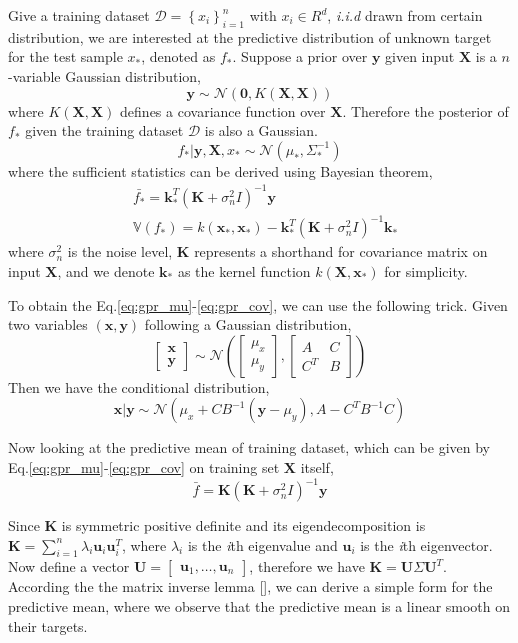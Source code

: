 \documentclass{article}
\newcommand{\vct}[1]{\ensuremath{\boldsymbol{#1}}} %
\newcommand{\set}[1]{\ensuremath{\mathcal{#1}}}
\newcommand{\bb}[1]{\ensuremath{\mathbb{#1}}}
\newcommand{\bmat}[1]{\begin{bmatrix}#1\end{bmatrix}}
\newcommand{\question}[1]{\textcolor{red}{Q: #1}}
\begin{document}
Give a training dataset $\set D = \left\{x_i\right\}_{i=1}^n$ with $x_i \in R^d$, \textit{i.i.d} drawn from certain distribution, we are interested at the predictive distribution of unknown target for the  test sample $x_*$, denoted as $f_*$. Suppose a prior over $\vct y$ given input $\vct X$ is a $n$-variable Gaussian distribution,
\[
\vct y \sim \set N(\vct 0, K(\vct X, \vct X))
\]
where $K(\vct X, \vct X)$ defines a covariance function over $\vct X$. Therefore the posterior of $f_*$ given the training dataset $\set D$ is also a Gaussian.
\[
f_*|\vct y, \vct X, x_* \sim \set N(\mu_*, \Sigma_*^{-1})
\]
where the sufficient statistics can be derived using Bayesian theorem,
\begin{align}
	& \bar{f_*} = \vct k_{*}^T (\vct K +\sigma_n^2 I)^{-1}\vct y \label{eq:gpr_mu}\\
	& \bb{V}(f_*) = k(\vct x_*, \vct x_*) - \vct k_{*}^T (\vct K+\sigma_n^2 I)^{-1} \vct k_{*}  \label{eq:gpr_cov}
\end{align}
where $\sigma_n^2$ is the noise level, $\vct K$ represents a shorthand for covariance matrix on input $ \vct X $, and we denote $ \vct k_{*} $ as the kernel function $ k(\vct X, \vct x_*) $ for simplicity.

To obtain the Eq.\eqref{eq:gpr_mu}-\eqref{eq:gpr_cov}, we can use the following trick.
Given two variables $(\vct x, \vct y)$ following a Gaussian distribution,
\[
\bmat{\vct x\\ \vct y} \sim \set N\left(
\bmat{\mu_x \\ \mu_y}, \bmat{A & C \\ C^T & B}
\right)
\]
Then we have the conditional distribution,
\[
\vct x|\vct y \sim \set N\left(\mu_x+CB^{-1}(\vct y - \mu_y), A - C^TB^{-1}C \right)
\]

Now looking at the predictive mean of training dataset, which can be given by Eq.\eqref{eq:gpr_mu}-\eqref{eq:gpr_cov} on training set $ \vct X $ itself, 
\[ \bar{f} = \vct K(\vct K + \sigma_n^2 I)^{-1}\vct y \]

Since $ \vct K $ is symmetric positive definite and its eigendecomposition is $ \vct K=\sum_{i=1}^n \lambda_i\vct u_i \vct u_i^T$, where $ \lambda_i $ is the \textit{i}th eigenvalue and $ \vct u_i $ is the \textit{i}th eigenvector. Now define a vector $ \vct U=\bmat{\vct u_1, \ldots, \vct u_n} $, therefore we have $ \vct K = \vct U\Sigma\vct U^T $. According the the matrix inverse lemma [\cite{mil86}], we can derive a simple form for the predictive mean, where we observe that the predictive mean is a linear smooth on their targets. 
\end{document}
